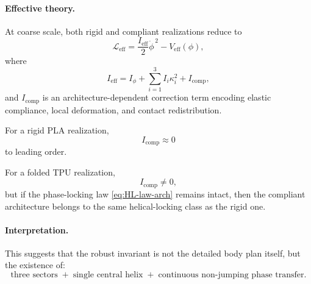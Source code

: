 \documentclass[11pt]{article}
\begin{document}
            \paragraph{Effective theory.}
                At coarse scale, both rigid and compliant realizations reduce to
            \begin{equation}
                \mathcal{L}_{\mathrm{eff}}
                =
                \frac{I_{\mathrm{eff}}}{2}\dot{\phi}^{\,2}
                -
                V_{\mathrm{eff}}(\phi),
                \label{eq:Leff-arch}
                \end{equation}
                where
            \begin{equation}
                I_{\mathrm{eff}}
                =
                I_{\phi}
                +
                \sum_{i=1}^{3} I_i \kappa_i^2
                +
                I_{\mathrm{comp}},
                \label{eq:Ieff-arch}
                \end{equation}
                and \(I_{\mathrm{comp}}\) is an architecture-dependent correction term encoding elastic compliance, local deformation, and contact redistribution.
                
                For a rigid PLA realization,
            \begin{equation}
                I_{\mathrm{comp}} \approx 0
                \end{equation}
                to leading order.
                
                For a folded TPU realization,
            \begin{equation}
                I_{\mathrm{comp}} \neq 0,
                \end{equation}
                but if the phase-locking law \eqref{eq:HL-law-arch} remains intact, then the compliant architecture belongs to the same helical-locking class as the rigid one.
            
            \paragraph{Interpretation.}
                This suggests that the robust invariant is not the detailed body plan itself, but the existence of:
            \begin{equation}
                \text{three sectors}
                \;+\;
                \text{single central helix}
                \;+\;
                \text{continuous non-jumping phase transfer}.
                \end{equation}
            
\end{document}

